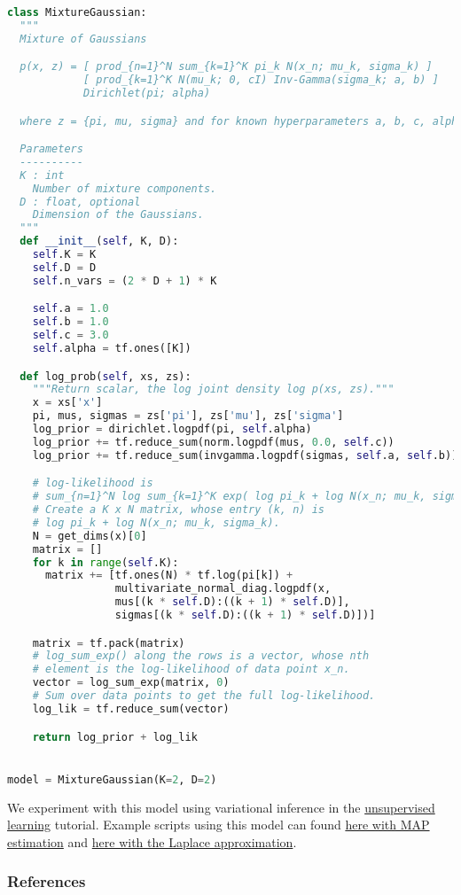 \begin{lstlisting}[language=Python]
class MixtureGaussian:
  """
  Mixture of Gaussians

  p(x, z) = [ prod_{n=1}^N sum_{k=1}^K pi_k N(x_n; mu_k, sigma_k) ]
            [ prod_{k=1}^K N(mu_k; 0, cI) Inv-Gamma(sigma_k; a, b) ]
            Dirichlet(pi; alpha)

  where z = {pi, mu, sigma} and for known hyperparameters a, b, c, alpha.

  Parameters
  ----------
  K : int
    Number of mixture components.
  D : float, optional
    Dimension of the Gaussians.
  """
  def __init__(self, K, D):
    self.K = K
    self.D = D
    self.n_vars = (2 * D + 1) * K

    self.a = 1.0
    self.b = 1.0
    self.c = 3.0
    self.alpha = tf.ones([K])

  def log_prob(self, xs, zs):
    """Return scalar, the log joint density log p(xs, zs)."""
    x = xs['x']
    pi, mus, sigmas = zs['pi'], zs['mu'], zs['sigma']
    log_prior = dirichlet.logpdf(pi, self.alpha)
    log_prior += tf.reduce_sum(norm.logpdf(mus, 0.0, self.c))
    log_prior += tf.reduce_sum(invgamma.logpdf(sigmas, self.a, self.b))

    # log-likelihood is
    # sum_{n=1}^N log sum_{k=1}^K exp( log pi_k + log N(x_n; mu_k, sigma_k) )
    # Create a K x N matrix, whose entry (k, n) is
    # log pi_k + log N(x_n; mu_k, sigma_k).
    N = get_dims(x)[0]
    matrix = []
    for k in range(self.K):
      matrix += [tf.ones(N) * tf.log(pi[k]) +
                 multivariate_normal_diag.logpdf(x,
                 mus[(k * self.D):((k + 1) * self.D)],
                 sigmas[(k * self.D):((k + 1) * self.D)])]

    matrix = tf.pack(matrix)
    # log_sum_exp() along the rows is a vector, whose nth
    # element is the log-likelihood of data point x_n.
    vector = log_sum_exp(matrix, 0)
    # Sum over data points to get the full log-likelihood.
    log_lik = tf.reduce_sum(vector)

    return log_prior + log_lik


model = MixtureGaussian(K=2, D=2)
\end{lstlisting}

We experiment with this model using variational inference in the
\href{tut_unsupervised}{unsupervised learning} tutorial.
Example scripts using this model can found
\href{https://github.com/blei-lab/edward/blob/master/examples/tf_mixture_gaussian_map.py}
{here with MAP estimation} and
\href{https://github.com/blei-lab/edward/blob/master/examples/tf_mixture_gaussian_laplace.py}
{here with the Laplace approximation}.

\subsubsection{References}\label{references}
